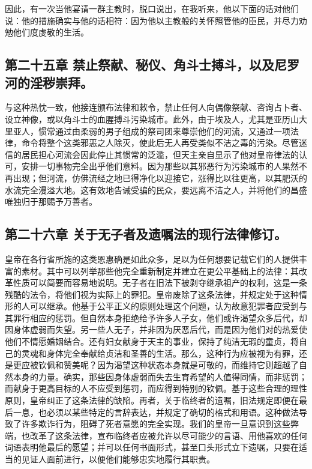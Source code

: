 因此，有一次当他宴请一群主教时，脱口说出，在我听来，他以下面的话对他们说：他的措施确实与他的话相符：因为他以主教般的关怀照管他的臣民，并尽力劝勉他们度虔敬的生活。\par


\subsection{第二十五章 禁止祭献、秘仪、角斗士搏斗，以及尼罗河的淫秽崇拜。}

与这种热忱一致，他接连颁布法律和敕令，禁止任何人向偶像祭献、咨询占卜者、设立神像，或以角斗士的血腥搏斗污染城市。此外，由于埃及人，尤其是亚历山大里亚人，惯常通过由柔弱的男子组成的祭司团来尊崇他们的河流，又通过一项法律，命令将整个这类邪恶之人除灭，使此后无人再受类似不洁之毒的污染。尽管迷信的居民担心河流会因此停止其惯常的泛滥，但天主亲自显示了他对皇帝律法的认可，安排一切事物完全出乎他们意料。因为那些以其邪恶行为污染城市的人果然不再出现；但河流，仿佛流经之地已得净化以迎接它，涨得比以往更高，以其肥沃的水流完全漫溢大地。这有效地告诫受骗的民众，要远离不洁之人，并将他们的昌盛唯独归于那赐予万善者。\par


\subsection{第二十六章 关于无子者及遗嘱法的现行法律修订。}

皇帝在各行省所施的这类恩惠确是如此众多，足以为任何想要记载它们的人提供丰富的素材。其中可以列举那些他完全重新制定并建立在更公平基础上的法律：其改革性质可以简要而容易地说明。无子者在旧法下被剥夺继承祖产的权利，这是一条残酷的法令，将他们视为实际上的罪犯。皇帝废除了这条法律，并规定处于这种情形的人可以继承。他基于公平正义的原则处理这个问题，认为故意犯罪者应受到与其罪行相应的惩罚。但自然本身拒绝给予许多人子女，他们或许渴望众多后代，却因身体虚弱而失望。另一些人无子，并非因为厌恶后代，而是因为他们对的热爱使他们不情愿婚姻结合。还有妇女献身于天主的事业，保持了纯洁无瑕的童贞，将自己的灵魂和身体完全奉献给贞洁和圣善的生活。那么，这种行为应被视为有罪，还是更应被钦佩和赞美呢？因为渴望这种状态本身就是可敬的，而维持它则超越了自然本身的力量。确实，那些因身体虚弱而失去生育希望的人值得同情，而非惩罚；而献身于更高目标的人不应受到惩罚，而应得到特别的钦佩。基于这些合理的理性原则，皇帝纠正了这条法律的缺陷。再者，关于临终者的遗嘱，旧法规定即便在最后一息，也必须以某些特定的言辞表达，并规定了确切的格式和用语。这种做法导致了许多欺诈行为，阻碍了死者意愿的完全实现。我们的皇帝一旦意识到这些弊端，也改革了这条法律，宣布临终者应被允许以尽可能少的言语、用他喜欢的任何词语表明他最后的愿望；并可以任何书面形式，甚至口头形式立下遗嘱，只要在适当的见证人面前进行，以便他们能够忠实地履行其职责。\par

